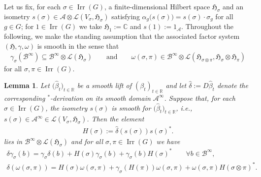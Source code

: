 \documentclass[10pt,a4paper]{amsart}
\numberwithin{equation}{section}
\newtheorem{Lemma}[Theorem]{Lemma}
\newcommand*{\R}{\mathbb R}		%
\newcommand*{\C}{\mathbb C}		%
\newcommand*{\tensor}{\otimes}		%
\newcommand*{\Star}{$^*$\nobreakdash}
\newcommand*{\hilb}{\mathfrak}		%
\newcommand*{\alg}{\mathcal}		%
\newcommand*{\hH}{\hilb{H}}			%
\newcommand*{\one}{1}				%
\newcommand*{\aA}{\alg{A}}			%
\newcommand*{\aB}{\alg{B}} 			%
\newcommand*{\End}{\mathcal{L}} %
\DeclareMathOperator{\Irrep}{Irr} 			%
\begin{document}
Let us fix, for each $\sigma \in \Irrep(G)$, a finite-dimensional Hilbert space $\hH_\sigma$ and an isometry $s(\sigma)\in \aA \tensor \End(V_\sigma,\hH_\sigma)$ satisfying $\alpha_g\big(s(\sigma)\big)=s(\sigma) \cdot \sigma_g$ for all $g \in G$; for $1 \in \Irrep(G)$ we take $\hH_1 := \C$ and $s(1) := \one_\aA$.
Throughout the following, we make the standing assumption that the associated factor system $(\hH, \gamma, \omega)$ is smooth in the sense that
\begin{gather*}
	\gamma_\sigma(\aB^\infty)
	\subseteq \aB^\infty \tensor \End(\hH_\sigma)
\qquad
	\text{and}
\qquad
	\omega(\sigma, \pi)
	\in \aB^\infty \tensor \End(\hH_{\sigma \tensor \pi},\hH_\sigma \tensor \hH_\pi)
\end{gather*}
for all $\sigma, \pi \in \Irrep(G)$.

\begin{Lemma}\label{lem:1_param_to_H}
	Let $\big(\hat\beta_t\big)_{t \in \R}$ be a smooth lift of $(\beta_t)_{t \in \R}$ and let $\hat \delta := D\hat\beta_t$ denote the corresponding \Star-derivation on its smooth domain $\aA^\infty$.
	Suppose that, for each $\sigma \in \Irrep(G)$, the isometry $s(\sigma)$ is smooth for $\big(\hat\beta_t\big)_{t \in \R}$, i.e., $s(\sigma) \in \aA^\infty \in \End(V_\sigma, \hH_\sigma)$.
	Then the element
	\begin{gather*}
		H(\sigma) := \hat \delta ( s(\sigma) ) s(\sigma)^* .
	\end{gather*}
	lies in $\aB^\infty \tensor \End(\hH_\sigma)$ and for all $\sigma, \pi \in \Irrep(G)$ we have
	\begin{gather}
		\label{eq:deriv_cond_1}
		\delta \gamma_\sigma(b)
		= \gamma_\sigma \delta(b) + H(\sigma) \gamma_\sigma(b) + \gamma_\sigma(b) H(\sigma)^*
		\qquad \forall b \in \aB^\infty,
		\\
		\label{eq:deriv_cond_2}		
		\delta ( \omega(\sigma,\pi) )
		= H(\sigma) \omega(\sigma,\pi) + \gamma_\sigma (H(\pi) ) \omega(\sigma,\pi) + \omega(\sigma,\pi) H(\sigma \tensor \pi)^*.
	\end{gather}
\end{Lemma}
\end{document}
